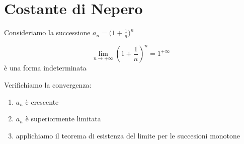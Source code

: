 \section{Costante di Nepero}

Consideriamo la successione $ a_{n} = \big(1+\frac{1}{n}\big)^n $

\[
  \lim_{n\to +\infty} (1+\frac{1}{n})^n =  1^{+\infty}
\] è una forma indeterminata

Verifichiamo la convergenza:
\begin{enumerate}
    \item $ a_{n}$ è crescente
    \item $ a_{n}$ è superiormente limitata
    \item applichiamo il teorema di esistenza del limite per le succesioni monotone
\end{enumerate}

